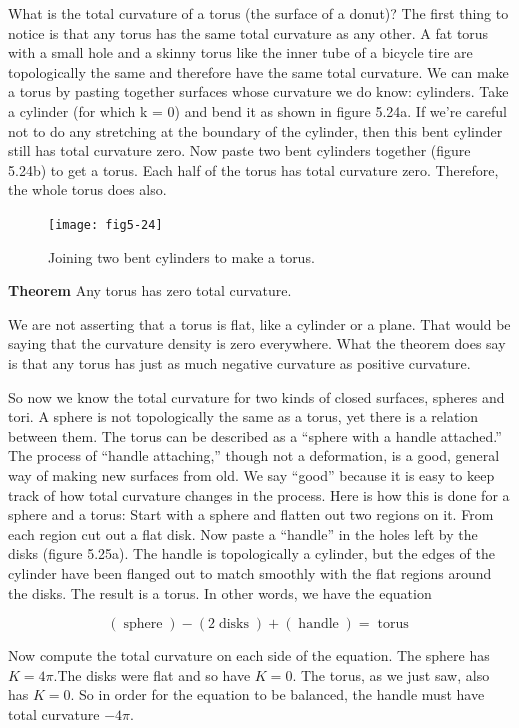\documentclass{book}
\begin{document}
What is the total curvature of a torus (the surface of a donut)? The first
thing to notice is that any torus has the same total curvature as any
other. A fat torus with a small hole and a skinny torus like the inner
tube of a bicycle tire are topologically the same and therefore have the
same total curvature. We can make a torus by pasting together surfaces
whose curvature we do know: cylinders. Take a cylinder (for which k =
0) and bend it as shown in figure 5.24a. If we're careful not to do any
stretching at the boundary of the cylinder, then this bent cylinder still
has total curvature zero. Now paste two bent cylinders together (figure
5.24b) to get a torus. Each half of the torus has total curvature zero.
Therefore, the whole torus does also.

\begin{figure}
\begin{center}
\texttt{[image: fig5-24]}
\caption{Joining two bent cylinders to make a torus.}
\end{center}
\end{figure}

\textbf{Theorem} Any torus has zero total curvature.

We are not asserting that a torus is flat, like a cylinder or a plane. That
would be saying that the curvature density is zero everywhere. What the
theorem does say is that any torus has just as much negative curvature
as positive curvature.

So now we know the total curvature for two kinds of closed surfaces,
spheres and tori. A sphere is not topologically the same as a torus, yet
there is a relation between them. The torus can be described as a ``sphere
with a handle attached.'' The process of ``handle attaching,'' though not
a deformation, is a good, general way of making new surfaces from old.
We say ``good'' because it is easy to keep track of how total curvature
changes in the process. Here is how this is done for a sphere and a torus:
Start with a sphere and flatten out two regions on it. From each
region cut out a flat disk. Now paste a ``handle'' in the holes left by
the disks (figure 5.25a). The handle is topologically a cylinder, but the
edges of the cylinder have been flanged out to match smoothly with the
flat regions around the disks. The result is a torus. In other words, we
have the equation

$$(\operatorname{sphere}) - (2 \operatorname{disks}) + (\operatorname{handle}) = \operatorname{torus}$$

Now compute the total curvature on each side of the equation. The
sphere has $K = 4 \pi$.The disks were flat and so have $K = 0$. The torus,
as we just saw, also has $K = 0$. So in order for the equation to be
balanced, the handle must have total curvature $-4 \pi$.
\end{document}
